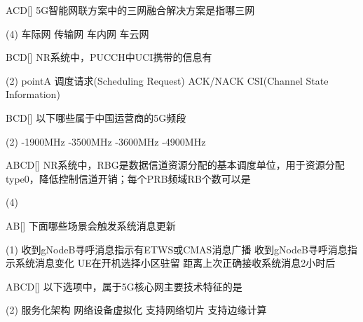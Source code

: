 \begin{choice}{\;ACD\;}[]
    5G智能网联方案中的三网融合解决方案是指哪三网
    \begin{tasks}(4)
        \task 车际网
        \task 传输网
        \task 车内网
        \task 车云网
    \end{tasks}
\end{choice}

\begin{choice}{\;BCD\;}[]
    NR系统中，PUCCH中UCI携带的信息有
    \begin{tasks}(2)
        \task pointA
        \task 调度请求(Scheduling Request)
        \task ACK/NACK
        \task CSI(Channel State Information)
    \end{tasks}
\end{choice}

\begin{choice}{\;BCD\;}[]
    以下哪些属于中国运营商的5G频段
    \begin{tasks}(2)
        -1900MHz
        -3500MHz
        -3600MHz
        -4900MHz
    \end{tasks}
\end{choice}

\begin{choice}{\;ABCD\;}[]
    NR系统中，RBG是数据信道资源分配的基本调度单位，用于资源分配type0，降低控制信道开销；每个PRB频域RB个数可以是
    \begin{tasks}(4)
    \end{tasks}
\end{choice}

\begin{choice}{\;AB\;}[]
    下面哪些场景会触发系统消息更新
    \begin{tasks}(1)
        \task 收到gNodeB寻呼消息指示有ETWS或CMAS消息广播
        \task 收到gNodeB寻呼消息指示系统消息变化
        \task  UE在开机选择小区驻留
        \task 距离上次正确接收系统消息2小时后
    \end{tasks}
\end{choice}

\begin{choice}{\;ABCD\;}[]
    以下选项中，属于5G核心网主要技术特征的是
    \begin{tasks}(2)
        \task 服务化架构
        \task 网络设备虚拟化
        \task 支持网络切片
        \task 支持边缘计算
    \end{tasks}
\end{choice}

